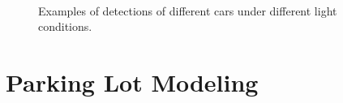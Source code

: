 \begin{figure}[p]
\hspace{2mm}
\hspace{2mm}
\\
\caption{Examples of detections of different cars under different light conditions.}
\label{fig:detection_examples}
\end{figure}


\section{Parking Lot Modeling}
\label{sec:parking_lots_modeling}

